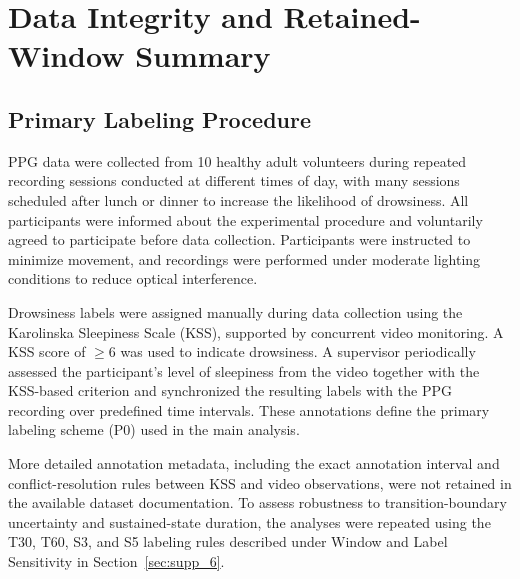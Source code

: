 \documentclass[conference,a4paper]{IEEEtran}
\begin{document}


\section{Data Integrity and Retained-Window Summary}
\label{sec:supp_1}

\subsection{Primary Labeling Procedure}
\label{sec:supp_labeling}

PPG data were collected from 10 healthy adult volunteers during repeated recording sessions conducted at different times of day, with many sessions scheduled after lunch or dinner to increase the likelihood of drowsiness. All participants were informed about the experimental procedure and voluntarily agreed to participate before data collection. Participants were instructed to minimize movement, and recordings were performed under moderate lighting conditions to reduce optical interference.

Drowsiness labels were assigned manually during data collection using the Karolinska Sleepiness Scale (KSS), supported by concurrent video monitoring. A KSS score of $\geq 6$ was used to indicate drowsiness. A supervisor periodically assessed the participant's level of sleepiness from the video together with the KSS-based criterion and synchronized the resulting labels with the PPG recording over predefined time intervals. These annotations define the primary labeling scheme (P0) used in the main analysis.

More detailed annotation metadata, including the exact annotation interval and conflict-resolution rules between KSS and video observations, were not retained in the available dataset documentation. To assess robustness to transition-boundary uncertainty and sustained-state duration, the analyses were repeated using the T30, T60, S3, and S5 labeling rules described under Window and Label Sensitivity in Section~\ref{sec:supp_6}.
\end{document}
